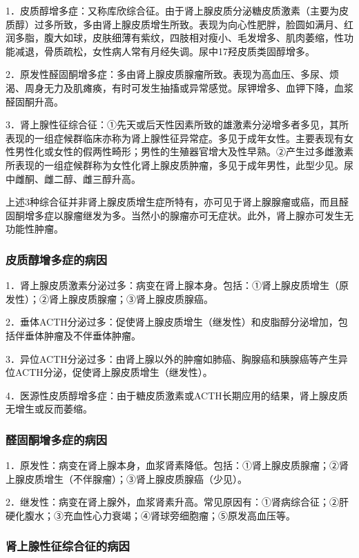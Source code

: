 1．皮质醇增多症：又称库欣综合征。由于肾上腺皮质分泌糖皮质激素（主要为皮质醇）过多所致，多由肾上腺皮质增生所致。表现为向心性肥胖，脸圆如满月、红润多脂，腹大如球，皮肤细薄有紫纹，四肢相对瘦小、毛发增多、肌肉萎缩，性功能减退，骨质疏松，女性病人常有月经失调。尿中17羟皮质类固醇增多。

2．原发性醛固酮增多症：多由肾上腺皮质腺瘤所致。表现为高血压、多尿、烦渴、周身无力及肌瘫痪，有时可发生抽搐或异常感觉。尿钾增多、血钾下降，血浆醛固酮升高。

3．肾上腺性征综合征：①先天或后天性因素所致的雄激素分泌增多者多见，其所表现的一组症候群临床亦称为肾上腺性征异常症。多见于成年女性。主要表现有女性男性化或女性的假两性畸形；男性的生殖器官增大及性早熟。②产生过多雌激素所表现的一组症候群称为女性化肾上腺皮质肿瘤，多见于成年男性，此型少见。尿中雌酮、雌二醇、雌三醇升高。

上述3种综合征并非肾上腺皮质增生症所特有，亦可见于肾上腺腺瘤或癌，而且醛固酮增多症以腺瘤继发为多。当然小的腺瘤亦可无症状。此外，肾上腺亦可发生无功能性肿瘤。

\subsubsection{皮质醇增多症的病因}

1．肾上腺皮质激素分泌过多：病变在肾上腺本身。包括：①肾上腺皮质增生（原发性）；②肾上腺皮质腺瘤；③肾上腺皮质腺癌。

2．垂体ACTH分泌过多：促使肾上腺皮质增生（继发性）和皮脂醇分泌增加，包括伴垂体肿瘤及不伴垂体肿瘤。

3．异位ACTH分泌过多：由肾上腺以外的肿瘤如肺癌、胸腺癌和胰腺癌等产生异位ACTH分泌，促使肾上腺皮质增生（继发性）。

4．医源性皮质醇增多症：由于糖皮质激素或ACTH长期应用的结果，肾上腺皮质无增生或反而萎缩。

\subsubsection{醛固酮增多症的病因}

1．原发性：病变在肾上腺本身，血浆肾素降低。包括：①肾上腺皮质腺瘤；②肾上腺皮质增生（不伴腺瘤）；③肾上腺皮质腺癌（少见）。

2．继发性：病变在肾上腺外，血浆肾素升高。常见原因有：①肾病综合征；②肝硬化腹水；③充血性心力衰竭；④肾球旁细胞瘤；⑤原发高血压等。

\subsubsection{肾上腺性征综合征的病因}

